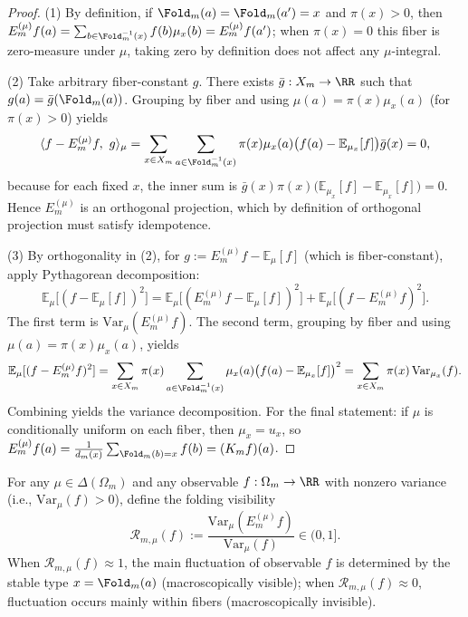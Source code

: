 \begin{proof}
(1) By definition, if $\Fold_m(a)=\Fold_m(a')=x$ and $\pi(x)>0$, then
\(
E_m^{(\mu)}f(a)=\sum_{b\in\Fold_m^{-1}(x)}f(b)\mu_x(b)=E_m^{(\mu)}f(a')
\);
when $\pi(x)=0$ this fiber is zero-measure under $\mu$, taking zero by definition does not affect any $\mu$-integral.

(2) Take arbitrary fiber-constant $g$. There exists $\bar g:X_m\to\RR$ such that $g(a)=\bar g(\Fold_m(a))$.
Grouping by fiber and using $\mu(a)=\pi(x)\mu_x(a)$ (for $\pi(x)>0$) yields
\[
\langle f-E_m^{(\mu)}f,\ g\rangle_\mu
=\sum_{x\in X_m}\sum_{a\in\Fold_m^{-1}(x)}\pi(x)\mu_x(a)\bigl(f(a)-\mathbb{E}_{\mu_x}[f]\bigr)\bar g(x)=0,
\]
because for each fixed $x$, the inner sum is
\(
\bar g(x)\pi(x)\bigl(\mathbb{E}_{\mu_x}[f]-\mathbb{E}_{\mu_x}[f]\bigr)=0
\).
Hence $E_m^{(\mu)}$ is an orthogonal projection, which by definition of orthogonal projection must satisfy idempotence.

(3) By orthogonality in (2), for $g:=E_m^{(\mu)}f-\mathbb{E}_\mu[f]$ (which is fiber-constant), apply Pythagorean decomposition:
\[
\mathbb{E}_\mu\!\bigl[(f-\mathbb{E}_\mu[f])^2\bigr]
=\mathbb{E}_\mu\!\bigl[(E_m^{(\mu)}f-\mathbb{E}_\mu[f])^2\bigr]+\mathbb{E}_\mu\!\bigl[(f-E_m^{(\mu)}f)^2\bigr].
\]
The first term is $\mathrm{Var}_\mu(E_m^{(\mu)}f)$. The second term, grouping by fiber and using $\mu(a)=\pi(x)\mu_x(a)$, yields
\[
\mathbb{E}_\mu[(f-E_m^{(\mu)}f)^2]
=\sum_{x\in X_m}\pi(x)\sum_{a\in\Fold_m^{-1}(x)}\mu_x(a)\bigl(f(a)-\mathbb{E}_{\mu_x}[f]\bigr)^2
=\sum_{x\in X_m}\pi(x)\,\mathrm{Var}_{\mu_x}(f).
\]
Combining yields the variance decomposition. For the final statement: if $\mu$ is conditionally uniform on each fiber, then $\mu_x=u_x$, so
\(
E_m^{(\mu)}f(a)=\frac{1}{d_m(x)}\sum_{\Fold_m(b)=x}f(b)=(K_m f)(a)
\).
\end{proof}

\begin{definition}\label{def:pom-fold-visibility}
For any $\mu\in\Delta(\Omega_m)$ and any observable $f:\Omega_m\to\RR$ with nonzero variance (i.e., $\mathrm{Var}_\mu(f)>0$), define the folding visibility
\[
\mathcal{R}_{m,\mu}(f):=\frac{\mathrm{Var}_\mu(E_m^{(\mu)}f)}{\mathrm{Var}_\mu(f)}\in(0,1].
\]
When $\mathcal{R}_{m,\mu}(f)\approx 1$, the main fluctuation of observable $f$ is determined by the stable type $x=\Fold_m(a)$ (macroscopically visible); when $\mathcal{R}_{m,\mu}(f)\approx 0$, fluctuation occurs mainly within fibers (macroscopically invisible).
\end{definition}

